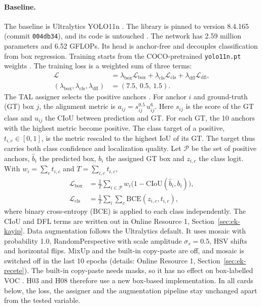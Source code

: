 \documentclass[pdflatex,iicol,sn-mathphys-num]{sn-jnl}
\begin{document}
\paragraph{Baseline.}
The baseline is Ultralytics YOLO11n \cite{jocher_2024_yolo11}. The library is pinned to version 8.4.165 (commit \texttt{004db34}), and its code is untouched \cite{ultralytics_2026_v84165}. The network has 2.59 million parameters and 6.52 GFLOPs. Its head is anchor-free and decouples classification from box regression. Training starts from the COCO-pretrained \texttt{yolo11n.pt} weights \cite{lin_2014_coco}. The training loss is a weighted sum of three terms:
\begin{equation}\label{eq:toplam}
\begin{aligned}
\mathcal L&=\lambda_{\mathrm{box}}\mathcal L_{\mathrm{box}}+\lambda_{\mathrm{cls}}\mathcal L_{\mathrm{cls}}+\lambda_{\mathrm{dfl}}\mathcal L_{\mathrm{dfl}},\\
(\lambda_{\mathrm{box}},\lambda_{\mathrm{cls}},\lambda_{\mathrm{dfl}})&=(7.5,\,0.5,\,1.5).
\end{aligned}
\end{equation}
The TAL assigner selects the positive anchors \cite{feng_2021_tood}. For anchor $i$ and ground-truth (GT) box $j$, the alignment metric is $a_{ij}=s_{ij}^{0.5}\,u_{ij}^{6}$. Here $s_{ij}$ is the score of the GT class and $u_{ij}$ the CIoU between prediction and GT. For each GT, the 10 anchors with the highest metric become positive. The class target of a positive, $t_{i,c}\in[0,1]$, is the metric rescaled to the highest IoU of its GT. The target thus carries both class confidence and localization quality. Let $\mathcal P$ be the set of positive anchors, $\hat b_i$ the predicted box, $b_i$ the assigned GT box and $z_{i,c}$ the class logit. With $w_i=\sum_c t_{i,c}$ and $T=\sum_{i,c}t_{i,c}$,
\begin{equation}\label{eq:box}
\begin{aligned}
\mathcal L_{\mathrm{box}}&=\frac1T\sum_{i\in\mathcal P}w_i\bigl(1-\mathrm{CIoU}(\hat b_i,b_i)\bigr),\\
\mathcal L_{\mathrm{cls}}&=\frac1T\sum_{i}\sum_{c}\mathrm{BCE}(z_{i,c},t_{i,c}),
\end{aligned}
\end{equation}
where binary cross-entropy (BCE) is applied to each class independently. The CIoU \cite{zheng_2020_diou} and DFL \cite{li_2020_gfl} terms are written out in Online Resource 1, Section~\ref{sec:ek-kayip}. Data augmentation follows the Ultralytics default. It uses mosaic with probability 1.0, RandomPerspective with scale amplitude $\sigma_s=0.5$, HSV shifts and horizontal flips. MixUp and the built-in copy-paste are off, and mosaic is switched off in the last 10 epochs (details: Online Resource 1, Section~\ref{sec:ek-recete}). The built-in copy-paste needs masks, so it has no effect on box-labelled VOC \cite{ultralytics_2026_v84165}. H03 and H08 therefore use a new box-based implementation. In all cards below, the loss, the assigner and the augmentation pipeline stay unchanged apart from the tested variable.
\end{document}
